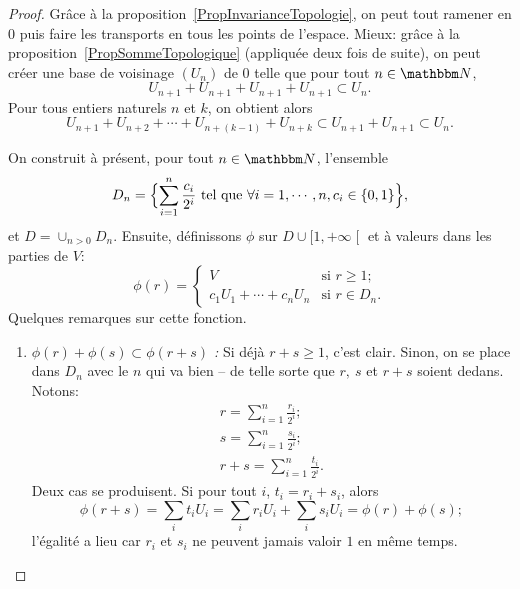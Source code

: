 \begin{proof}
Grâce à la proposition~\ref{PropInvarianceTopologie}, on peut tout ramener en \(0 \) puis faire les transports en tous les points de l'espace. Mieux: grâce à la proposition~\ref{PropSommeTopologique} (appliquée deux fois de suite), on peut créer une base de voisinage \( (U_n) \) de \( 0 \) telle que pour tout \(n \in \eN\),
\begin{equation}\label{EqBaseTopoMetriquePf1}
  U_{n+1} + U_{n+1} + U_{n+1} + U_{n+1} \subset U_n.
\end{equation}
Pour tous entiers naturels \(n\) et \(k\), on obtient alors
\begin{equation}\label{EqBaseTopoMetriquePf2}
  U_{n+1} + U_{n+2} + \cdots  + U_{n+(k-1)} + U_{n+k} \subset  U_{n+1} + U_{n+1} \subset U_n.
\end{equation}

On construit à présent, pour tout \( n \in \eN \), l'ensemble
\begin{equation}
  D_n = \Bigl\{\sum_{i=1}^n \frac {c_i} {2^i} \text{ tel que } \forall i = 1,\cdots, n, c_i \in \{0,1\}\Bigr\},
\end{equation}
et \( D = \cup_{n>0} D_n\). Ensuite, définissons \(\phi \) sur \(D \cup \mathopen[1,+ \infty\mathclose[ \) et à valeurs dans les parties de \( V \):
\begin{equation}
  \phi (r) =
  \begin{cases}
    V & \text{si } r \geq 1;\\
    c_1 U_1 + \cdots + c_n U_n & \text{si } r \in D_n.
  \end{cases}
\end{equation}
Quelques remarques sur cette fonction.
\begin{enumerate}
  \item \emph{\(\phi(r) + \phi(s) \subset \phi(r+s)\) :} Si déjà \(r + s \geq 1 \), c'est clair. Sinon, on se place dans \( D_n \) avec le \(n \) qui va bien -- de telle sorte que \(r,\ s\) et \(r+s\) soient dedans. Notons:
    \begin{gather}
      r = \sum_{i=1}^n \frac {r_i}{2^i};\\
      s = \sum_{i=1}^n \frac {s_i}{2^i};\\
      r+s = \sum_{i=1}^n \frac {t_i}{2^i}.
    \end{gather}
    Deux cas se produisent. Si pour tout \(i\), \( t_i = r_i + s_i\), alors
    \begin{equation}
      \phi(r+s) = \sum_i t_i U_i = \sum_i r_i U_i + \sum_i s_i U_i = \phi(r) + \phi(s);
    \end{equation}
    l'égalité a lieu car \(r_i\) et \(s_i\) ne peuvent jamais valoir \(1\) en même temps.


\end{enumerate}
\end{proof}
